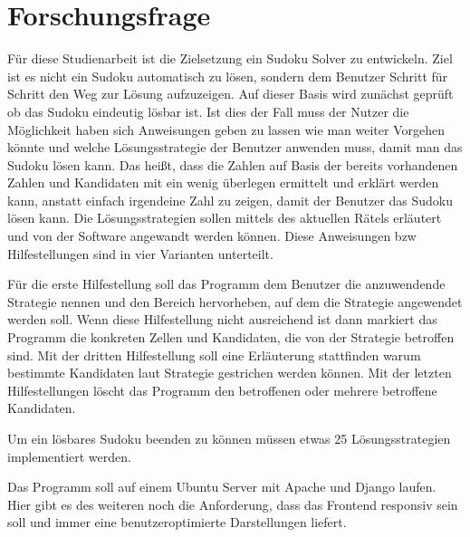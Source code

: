 \section{Forschungsfrage}

Für diese Studienarbeit ist die Zielsetzung ein Sudoku Solver zu entwickeln. Ziel ist es nicht ein Sudoku automatisch zu lösen, sondern dem Benutzer Schritt für Schritt den Weg zur Lösung aufzuzeigen. Auf dieser Basis wird zunächst geprüft ob das Sudoku eindeutig lösbar ist. Ist dies der Fall muss der Nutzer die Möglichkeit haben sich Anweisungen geben zu lassen wie man weiter Vorgehen könnte und welche Lösungsstrategie der Benutzer anwenden muss, damit man das Sudoku lösen kann. Das heißt, dass die Zahlen auf Basis der bereits vorhandenen Zahlen und Kandidaten mit ein wenig überlegen ermittelt und erklärt werden kann, anstatt einfach irgendeine Zahl zu zeigen, damit der Benutzer das Sudoku lösen kann. Die Lösungsstrategien sollen mittels des aktuellen Rätels erläutert und von der Software angewandt werden können. Diese Anweisungen bzw Hilfestellungen sind in vier Varianten unterteilt. 

Für die erste Hilfestellung soll das Programm dem Benutzer die anzuwendende Strategie nennen und den Bereich hervorheben, auf dem die Strategie angewendet werden soll. Wenn diese Hilfestellung nicht ausreichend ist dann markiert das Programm die konkreten Zellen und Kandidaten, die von der Strategie betroffen sind. Mit der dritten Hilfestellung soll eine Erläuterung stattfinden warum bestimmte Kandidaten laut Strategie gestrichen werden können. Mit der letzten Hilfestellungen löscht das Programm den betroffenen oder mehrere betroffene Kandidaten.

Um ein lösbares Sudoku beenden zu können müssen etwas 25 Lösungsstrategien implementiert werden. 

Das Programm soll auf einem Ubuntu Server mit Apache und Django laufen. Hier gibt es des weiteren noch die Anforderung, dass das Frontend responsiv sein soll und immer eine benutzeroptimierte Darstellungen liefert.